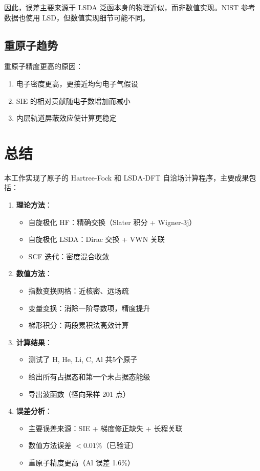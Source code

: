 \documentclass[12pt,a4paper]{article}
\begin{document}
因此，误差主要来源于 LSDA 泛函本身的物理近似，而非数值实现。NIST 参考数据也使用 LSD，但数值实现细节可能不同。

\subsection{重原子趋势}

重原子精度更高的原因：
\begin{enumerate}
    \item 电子密度更高，更接近均匀电子气假设
    \item SIE 的相对贡献随电子数增加而减小
    \item 内层轨道屏蔽效应使计算更稳定
\end{enumerate}

\section{总结}

本工作实现了原子的 Hartree-Fock 和 LSDA-DFT 自洽场计算程序，主要成果包括：

\begin{enumerate}
    \item \textbf{理论方法}：
          \begin{itemize}
              \item 自旋极化 HF：精确交换（Slater 积分 + Wigner-3j）
              \item 自旋极化 LSDA：Dirac 交换 + VWN 关联
              \item SCF 迭代：密度混合收敛
          \end{itemize}

    \item \textbf{数值方法}：
          \begin{itemize}
              \item 指数变换网格：近核密、远场疏
              \item 变量变换：消除一阶导数项，精度提升
              \item 梯形积分：两段累积法高效计算
          \end{itemize}

    \item \textbf{计算结果}：
          \begin{itemize}
              \item 测试了 H, He, Li, C, Al 共5个原子
              \item 给出所有占据态和第一个未占据态能级
              \item 导出波函数（径向采样 201 点）
          \end{itemize}

    \item \textbf{误差分析}：
          \begin{itemize}
              \item 主要误差来源：SIE + 梯度修正缺失 + 长程关联
              \item 数值方法误差 $<0.01\%$（已验证）
              \item 重原子精度更高（Al 误差 1.6\%）
          \end{itemize}
\end{enumerate}
\end{document}
